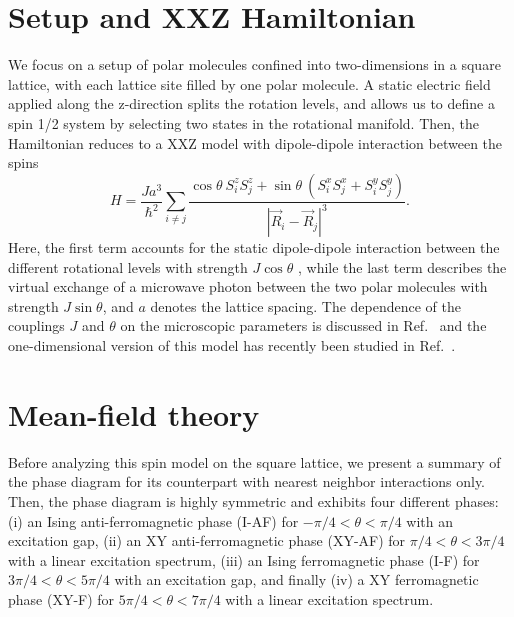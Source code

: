 \section{Setup and XXZ Hamiltonian}
We focus on a setup of polar molecules confined into two-dimensions in a square lattice,
with each lattice site filled by one polar molecule. A static electric field applied along
the z-direction splits the rotation levels, and allows us to define a spin 1/2 system by selecting
two states in the rotational manifold. Then, the Hamiltonian reduces to a XXZ model with dipole-dipole interaction
between the spins \cite{Gorshkov2011}
%
\begin{equation}
H = \frac{J a^3}{\hbar^2} \sum_{i \neq j} \frac{\cos \theta \:
S^{z}_{i}S^{z}_{j}+ \sin \theta
\: ( S^{x}_{i} S^{x}_{j} + S^{y}_{i} S^{y}_{j} ) }{|{\vec R}_{i} - {\vec R}_{j}|^3}.
\end{equation}
%
Here, the first term accounts for the static dipole-dipole
interaction between the different rotational levels with strength $J \cos \theta$ , while the last term
describes the virtual exchange of a microwave photon between the two polar molecules with
strength $J \sin \theta$, and $a$ denotes the lattice spacing.
The dependence of the couplings $J$ and $\theta$ on the microscopic
parameters is discussed in Ref.~\Cite{Muller2010,Gorshkov2011,Gorshkov2011c} and the one-dimensional version of this model has recently been studied in Ref.~\cite{Hauke2010}.

\section{Mean-field theory}

Before analyzing this spin model on the square lattice, we present a
summary of the phase diagram
for its counterpart with nearest neighbor interactions only.
Then, the phase diagram is highly symmetric and
exhibits four different phases: (i) an Ising
anti-ferromagnetic phase (I-AF) for $-\pi/4 < \theta < \pi/4$ with an
excitation gap, (ii) an XY anti-ferromagnetic phase (XY-AF) for $\pi/4 < \theta
< 3\pi/4$ with a linear excitation spectrum, (iii) an Ising ferromagnetic phase
(I-F) for $3 \pi/4 < \theta < 5\pi/4$ with an excitation gap, and finally (iv) a
XY ferromagnetic phase (XY-F) for $5 \pi/4 < \theta < 7\pi/4$ with a linear
excitation spectrum.

